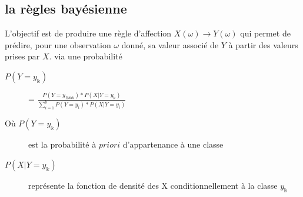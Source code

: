 \subsection{la règles bayésienne}
L'objectif est de produire une règle d'affection $X(\omega) \rightarrow Y(\omega)$ qui permet de prédire, pour une observation $\omega$ donné, sa valeur associé de $Y$ à partir des valeurs prises par $X$. via une probabilité\\
\begin{description}
\item[$P(Y=y_{\Bbbk})$] = $\frac{P(Y=y_{Bbbk})*P(X|Y=y_{\Bbbk})}{\sum_{i=1}^{\Bbbk} P(Y=y_i)*P(X|Y=y_i)}$
\item[Où $P(Y=y_{\Bbbk})$] est la probabilité à $priori$ d'appartenance à une classe
\item[$P(X|Y=y_{\Bbbk})$] représente la fonction de densité des X conditionnellement à la classe $y_{\Bbbk}$
\end{description}

\pagebreak
